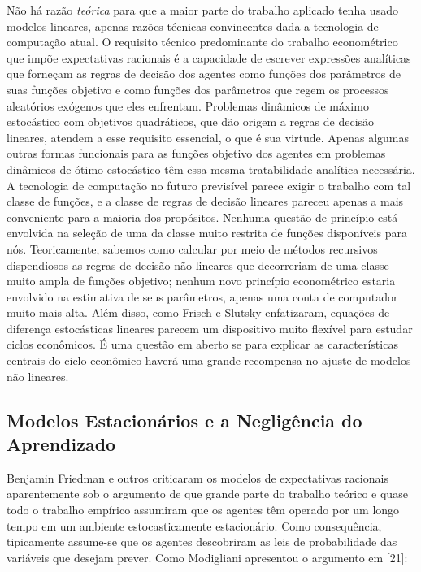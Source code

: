 \documentclass[12pt]{article}
\begin{document}
Não há razão \textit{teórica} para que a maior parte do trabalho aplicado tenha usado modelos lineares, apenas razões técnicas convincentes dada a tecnologia de computação atual. O requisito técnico predominante do trabalho econométrico que impõe expectativas racionais é a capacidade de escrever expressões analíticas que forneçam as regras de decisão dos agentes como funções dos parâmetros de suas funções objetivo e como funções dos parâmetros que regem os processos aleatórios exógenos que eles enfrentam. Problemas dinâmicos de máximo estocástico com objetivos quadráticos, que dão origem a regras de decisão lineares, atendem a esse requisito essencial, o que é sua virtude. Apenas algumas outras formas funcionais para as funções objetivo dos agentes em problemas dinâmicos de ótimo estocástico têm essa mesma tratabilidade analítica necessária. A tecnologia de computação no futuro previsível parece exigir o trabalho com tal classe de funções, e a classe de regras de decisão lineares pareceu apenas a mais conveniente para a maioria dos propósitos. Nenhuma questão de princípio está envolvida na seleção de uma da classe muito restrita de funções disponíveis para nós. Teoricamente, sabemos como calcular por meio de métodos recursivos dispendiosos as regras de decisão não lineares que decorreriam de uma classe muito ampla de funções objetivo; nenhum novo princípio econométrico estaria envolvido na estimativa de seus parâmetros, apenas uma conta de computador muito mais alta. Além disso, como Frisch e Slutsky enfatizaram, equações de diferença estocásticas lineares parecem um dispositivo muito flexível para estudar ciclos econômicos. É uma questão em aberto se para explicar as características centrais do ciclo econômico haverá uma grande recompensa no ajuste de modelos não lineares.

\subsection{Modelos Estacionários e a Negligência do Aprendizado}

Benjamin Friedman e outros criticaram os modelos de expectativas racionais aparentemente sob o argumento de que grande parte do trabalho teórico e quase todo o trabalho empírico assumiram que os agentes têm operado por um longo tempo em um ambiente estocasticamente estacionário. Como consequência, tipicamente assume-se que os agentes descobriram as leis de probabilidade das variáveis que desejam prever. Como Modigliani apresentou o argumento em [21]:
\end{document}
